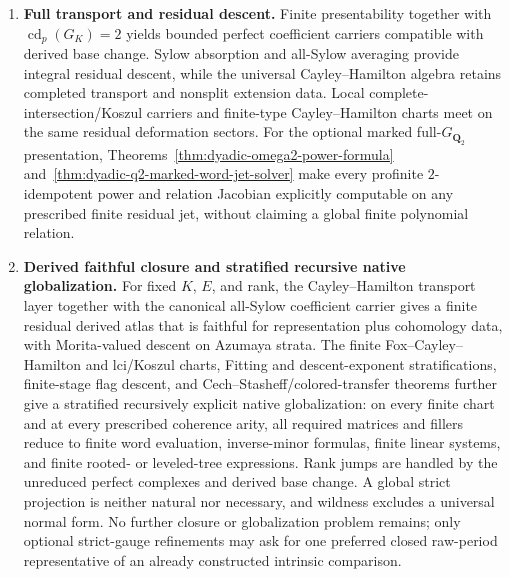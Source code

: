 \documentclass[11pt]{article}
\theoremstyle{definition}
\begin{document}
\begin{enumerate}[label=\textbf{(\arabic*)}]
Theorem~\ref{thm:dyadic-f132-formal-wild-elimination} shows that only two of the former four wild off-isotypic scalar generators are necessary on the complete marked relation ring.  Higher Magnus--Fox data and finite relation jets provide explicit finite deformation information when it is needed, without making a chosen presentation intrinsic.

\item \textbf{Full transport and residual descent.}
Finite presentability together with $\operatorname{cd}_p(G_K)=2$ yields bounded perfect coefficient carriers compatible with derived base change.  Sylow absorption and all-Sylow averaging provide integral residual descent, while the universal Cayley--Hamilton algebra retains completed transport and nonsplit extension data.  Local complete-intersection/Koszul carriers and finite-type Cayley--Hamilton charts meet on the same residual deformation sectors.  For the optional marked full-$G_{\mathbf Q_2}$ presentation, Theorems~\ref{thm:dyadic-omega2-power-formula} and~\ref{thm:dyadic-q2-marked-word-jet-solver} make every profinite $2$-idempotent power and relation Jacobian explicitly computable on any prescribed finite residual jet, without claiming a global finite polynomial relation.

\item \textbf{Derived faithful closure and stratified recursive native globalization.}
For fixed $K$, $E$, and rank, the Cayley--Hamilton transport layer together with the canonical all-Sylow coefficient carrier gives a finite residual derived atlas that is faithful for representation plus cohomology data, with Morita-valued descent on Azumaya strata.  The finite Fox--Cayley--Hamilton and lci/Koszul charts, Fitting and descent-exponent stratifications, finite-stage flag descent, and Cech--Stasheff/colored-transfer theorems further give a stratified recursively explicit native globalization: on every finite chart and at every prescribed coherence arity, all required matrices and fillers reduce to finite word evaluation, inverse-minor formulas, finite linear systems, and finite rooted- or leveled-tree expressions.  Rank jumps are handled by the unreduced perfect complexes and derived base change.  A global strict projection is neither natural nor necessary, and wildness excludes a universal normal form.  No further closure or globalization problem remains; only optional strict-gauge refinements may ask for one preferred closed raw-period representative of an already constructed intrinsic comparison.
\end{enumerate}
\end{document}
